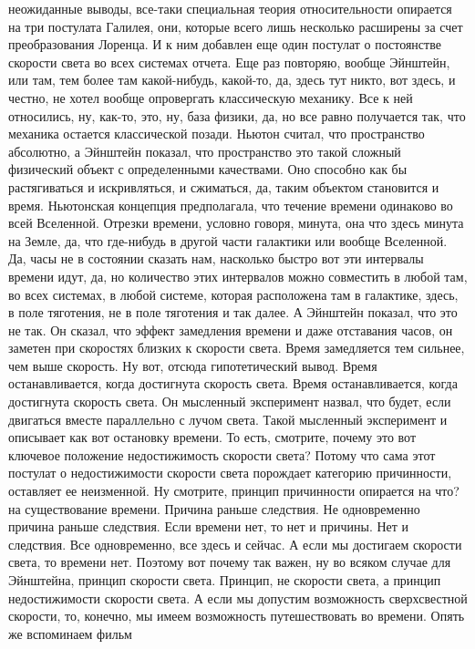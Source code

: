 неожиданные выводы, все-таки специальная теория относительности опирается на три
постулата Галилея, они, которые всего лишь несколько расширены за счет
преобразования Лоренца. И к ним добавлен еще один постулат о постоянстве
скорости света во всех системах отчета. Еще раз повторяю, вообще Эйнштейн, или
там, тем более там какой-нибудь, какой-то, да, здесь тут никто, вот здесь, и
честно, не хотел вообще опровергать классическую механику. Все к ней относились,
ну, как-то, это, ну, база физики, да, но все равно получается так, что механика
остается классической позади. Ньютон считал, что пространство абсолютно, а
Эйнштейн показал, что пространство это такой сложный физический объект с
определенными качествами. Оно способно как бы растягиваться и искривляться, и
сжиматься, да, таким объектом становится и время. Ньютонская концепция
предполагала, что течение времени одинаково во всей Вселенной. Отрезки времени,
условно говоря, минута, она что здесь минута на Земле, да, что где-нибудь в
другой части галактики или вообще Вселенной. Да, часы не в состоянии сказать
нам, насколько быстро вот эти интервалы времени идут, да, но количество этих
интервалов можно совместить в любой там, во всех системах, в любой системе,
которая расположена там в галактике, здесь, в поле тяготения, не в поле
тяготения и так далее. А Эйнштейн показал, что это не так. Он сказал, что эффект
замедления времени и даже отставания часов, он заметен при скоростях близких к
скорости света. Время замедляется тем сильнее, чем выше скорость. Ну вот, отсюда
гипотетический вывод. Время останавливается, когда достигнута скорость света.
Время останавливается, когда достигнута скорость света. Он мысленный эксперимент
назвал, что будет, если двигаться вместе параллельно с лучом света. Такой
мысленный эксперимент и описывает как вот остановку времени. То есть, смотрите,
почему это вот ключевое положение недостижимость скорости света? Потому что сама
этот постулат о недостижимости скорости света порождает категорию причинности,
оставляет ее неизменной. Ну смотрите, принцип причинности опирается на что? на
существование времени. Причина раньше следствия. Не одновременно причина раньше
следствия. Если времени нет, то нет и причины. Нет и следствия. Все
одновременно, все здесь и сейчас. А если мы достигаем скорости света, то времени
нет. Поэтому вот почему так важен, ну во всяком случае для Эйнштейна, принцип
скорости света. Принцип, не скорости света, а принцип недостижимости скорости
света. А если мы допустим возможность сверхсвестной скорости, то, конечно, мы
имеем возможность путешествовать во времени. Опять же вспоминаем фильм
